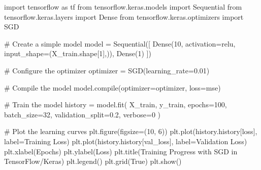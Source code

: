 \documentclass[
  letterpaper,
  DIV=11,
  numbers=noendperiod]{scrreprt}
\newenvironment{Shaded}{\begin{snugshade}}{\end{snugshade}}
\newcommand{\BuiltInTok}[1]{\textcolor[rgb]{0.00,0.23,0.31}{#1}}
\newcommand{\CommentTok}[1]{\textcolor[rgb]{0.37,0.37,0.37}{#1}}
\newcommand{\DecValTok}[1]{\textcolor[rgb]{0.68,0.00,0.00}{#1}}
\newcommand{\FloatTok}[1]{\textcolor[rgb]{0.68,0.00,0.00}{#1}}
\newcommand{\ImportTok}[1]{\textcolor[rgb]{0.00,0.46,0.62}{#1}}
\newcommand{\NormalTok}[1]{\textcolor[rgb]{0.00,0.23,0.31}{#1}}
\newcommand{\OperatorTok}[1]{\textcolor[rgb]{0.37,0.37,0.37}{#1}}
\newcommand{\StringTok}[1]{\textcolor[rgb]{0.13,0.47,0.30}{#1}}
\newcommand{\VariableTok}[1]{\textcolor[rgb]{0.07,0.07,0.07}{#1}}
\begin{document}
\begin{Shaded}
\begin{Highlighting}[]
\ImportTok{import}\NormalTok{ tensorflow }\ImportTok{as}\NormalTok{ tf}
\ImportTok{from}\NormalTok{ tensorflow.keras.models }\ImportTok{import}\NormalTok{ Sequential}
\ImportTok{from}\NormalTok{ tensorflow.keras.layers }\ImportTok{import}\NormalTok{ Dense}
\ImportTok{from}\NormalTok{ tensorflow.keras.optimizers }\ImportTok{import}\NormalTok{ SGD}

\CommentTok{\# Create a simple model}
\NormalTok{model }\OperatorTok{=}\NormalTok{ Sequential([}
\NormalTok{    Dense(}\DecValTok{10}\NormalTok{, activation}\OperatorTok{=}\StringTok{\textquotesingle{}relu\textquotesingle{}}\NormalTok{, input\_shape}\OperatorTok{=}\NormalTok{(X\_train.shape[}\DecValTok{1}\NormalTok{],)),}
\NormalTok{    Dense(}\DecValTok{1}\NormalTok{)}
\NormalTok{])}

\CommentTok{\# Configure the optimizer}
\NormalTok{optimizer }\OperatorTok{=}\NormalTok{ SGD(learning\_rate}\OperatorTok{=}\FloatTok{0.01}\NormalTok{)}

\CommentTok{\# Compile the model}
\NormalTok{model.}\BuiltInTok{compile}\NormalTok{(optimizer}\OperatorTok{=}\NormalTok{optimizer, loss}\OperatorTok{=}\StringTok{\textquotesingle{}mse\textquotesingle{}}\NormalTok{)}

\CommentTok{\# Train the model}
\NormalTok{history }\OperatorTok{=}\NormalTok{ model.fit(}
\NormalTok{    X\_train, y\_train, }
\NormalTok{    epochs}\OperatorTok{=}\DecValTok{100}\NormalTok{, }
\NormalTok{    batch\_size}\OperatorTok{=}\DecValTok{32}\NormalTok{, }
\NormalTok{    validation\_split}\OperatorTok{=}\FloatTok{0.2}\NormalTok{,}
\NormalTok{    verbose}\OperatorTok{=}\DecValTok{0}
\NormalTok{)}

\CommentTok{\# Plot the learning curves}
\NormalTok{plt.figure(figsize}\OperatorTok{=}\NormalTok{(}\DecValTok{10}\NormalTok{, }\DecValTok{6}\NormalTok{))}
\NormalTok{plt.plot(history.history[}\StringTok{\textquotesingle{}loss\textquotesingle{}}\NormalTok{], label}\OperatorTok{=}\StringTok{\textquotesingle{}Training Loss\textquotesingle{}}\NormalTok{)}
\NormalTok{plt.plot(history.history[}\StringTok{\textquotesingle{}val\_loss\textquotesingle{}}\NormalTok{], label}\OperatorTok{=}\StringTok{\textquotesingle{}Validation Loss\textquotesingle{}}\NormalTok{)}
\NormalTok{plt.xlabel(}\StringTok{\textquotesingle{}Epochs\textquotesingle{}}\NormalTok{)}
\NormalTok{plt.ylabel(}\StringTok{\textquotesingle{}Loss\textquotesingle{}}\NormalTok{)}
\NormalTok{plt.title(}\StringTok{\textquotesingle{}Training Progress with SGD in TensorFlow/Keras\textquotesingle{}}\NormalTok{)}
\NormalTok{plt.legend()}
\NormalTok{plt.grid(}\VariableTok{True}\NormalTok{)}
\NormalTok{plt.show()}
\end{Highlighting}
\end{Shaded}
\end{document}
